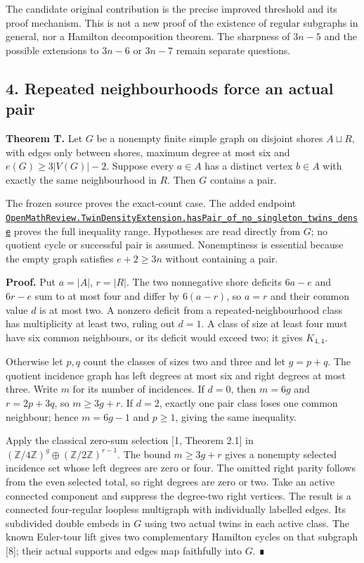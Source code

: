 \documentclass[
  11pt,
]{article}
\newcounter{none} %
\begin{document}
The candidate original contribution is the precise improved threshold
and its proof mechanism. This is not a new proof of the existence of
regular subgraphs in general, nor a Hamilton decomposition theorem. The
sharpness of \(3n-5\) and the possible extensions to \(3n-6\) or
\(3n-7\) remain separate questions.

\subsection{4. Repeated neighbourhoods force an actual
pair}\label{repeated-neighbourhoods-force-an-actual-pair}

\textbf{Theorem T.} Let \(G\) be a nonempty finite simple graph on
disjoint shores \(A\sqcup R\), with edges only between shores, maximum
degree at most six and \(e(G)\geq3|V(G)|-2\). Suppose every \(a\in A\)
has a distinct vertex \(b\in A\) with exactly the same neighbourhood in
\(R\). Then \(G\) contains a pair.

The frozen source proves the exact-count case. The added endpoint
\href{https://github.com/alejandrozu/openmath-2026-judging/blob/70c5ec3107658182f22c207d4c50f53f9cb3e602/robert-review-2026-10-07/lean/TwinDensityExtension.lean\#L132}{\texttt{OpenMathReview.TwinDensityExtension.hasPair\_of\_no\_singleton\_twins\_dense}}
proves the full inequality range. Hypotheses are read directly from
\(G\); no quotient cycle or successful pair is assumed. Nonemptiness is
essential because the empty graph satisfies \(e+2\geq3n\) without
containing a pair.

\textbf{Proof.} Put \(a=|A|\), \(r=|R|\). The two nonnegative shore
deficits \(6a-e\) and \(6r-e\) sum to at most four and differ by
\(6(a-r)\), so \(a=r\) and their common value \(d\) is at most two. A
nonzero deficit from a repeated-neighbourhood class has multiplicity at
least two, ruling out \(d=1\). A class of size at least four must have
six common neighbours, or its deficit would exceed two; it gives
\(K_{4,4}\).

Otherwise let \(p,q\) count the classes of sizes two and three and let
\(g=p+q\). The quotient incidence graph has left degrees at most six and
right degrees at most three. Write \(m\) for its number of incidences.
If \(d=0\), then \(m=6g\) and \(r=2p+3q\), so \(m\geq3g+r\). If \(d=2\),
exactly one pair class loses one common neighbour; hence \(m=6g-1\) and
\(p\geq1\), giving the same inequality.

Apply the classical zero-sum selection {[}1, Theorem 2.1{]} in
\((\mathbb Z/4\mathbb Z)^g\oplus(\mathbb Z/2\mathbb Z)^{r-1}\). The
bound \(m\geq3g+r\) gives a nonempty selected incidence set whose left
degrees are zero or four. The omitted right parity follows from the even
selected total, so right degrees are zero or two. Take an active
connected component and suppress the degree-two right vertices. The
result is a connected four-regular loopless multigraph with individually
labelled edges. Its subdivided double embeds in \(G\) using two actual
twins in each active class. The known Euler-tour lift gives two
complementary Hamilton cycles on that subgraph {[}8{]}; their actual
supports and edges map faithfully into \(G\). ∎
\end{document}

